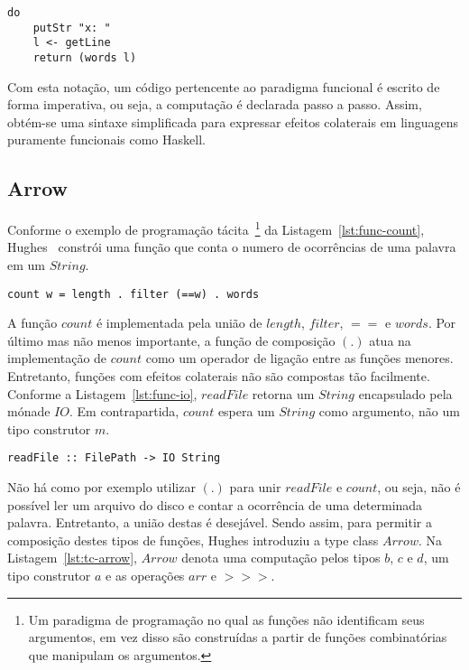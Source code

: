 \documentclass[10pt, conference]{IEEEtran}
\begin{document}
\begin{lstlisting}[caption={Encadeando Funções com Do Notation~\cite{marlow2010haskell}}, label={lst:do-notation}]
do 
	putStr "x: "
	l <- getLine
	return (words l)
\end{lstlisting}

Com esta notação, um código pertencente ao paradigma funcional é escrito de forma imperativa, ou seja, a computação é declarada passo a passo. Assim, obtém-se uma sintaxe simplificada para expressar efeitos colaterais em linguagens puramente funcionais como Haskell.

\subsection{Arrow}

Conforme o exemplo de programação tácita~\footnote{Um paradigma de programação no qual as funções não identificam seus argumentos, em vez disso são construídas a partir de funções combinatórias que manipulam os argumentos.} da Listagem~\ref{lst:func-count}, Hughes~\cite{hughes2005programming} constrói uma função que conta o numero de ocorrências de uma palavra em um $String$.

\begin{lstlisting}[caption={Função $count$~\cite{hughes2005programming}}, label={lst:func-count}]
count w = length . filter (==w) . words
\end{lstlisting}

A função $count$ é implementada pela união de $length$, $filter$, $==$ e $words$. Por último mas não menos importante, a função de composição $(.)$ atua na implementação de $count$ como um operador de ligação entre as funções menores. Entretanto, funções com efeitos colaterais não são compostas tão facilmente. 
Conforme a Listagem~\ref{lst:func-io}, $readFile$ retorna um $String$ encapsulado pela mónade $IO$. Em contrapartida, $count$ espera um $String$ como argumento, não um tipo construtor $m$.

\bigskip

\begin{lstlisting}[caption={Funções de E/S~\cite{hughes2005programming, hask2001prelude}}, label={lst:func-io}]
readFile :: FilePath -> IO String
\end{lstlisting}

Não há como por exemplo utilizar $(.)$ para unir $readFile$ e $count$, ou seja, não é possível ler um arquivo do disco e contar a ocorrência de uma determinada palavra. Entretanto, a união destas é desejável. Sendo assim, para permitir a composição destes tipos de funções, Hughes introduziu a type class $Arrow$. Na Listagem~\ref{lst:tc-arrow}, $Arrow$ denota uma computação pelos tipos $b$, $c$ e $d$, um tipo construtor $a$ e as operações $arr$ e $>>>$. 
\end{document}
